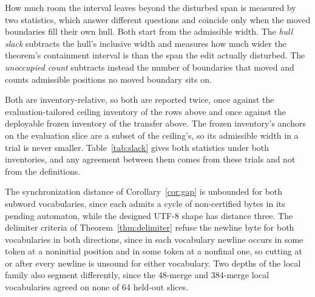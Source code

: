 \documentclass[11pt,a4paper]{article}
\theoremstyle{definition}
\theoremstyle{plain}
\newcommand{\code}[1]{\texttt{#1}}
\begin{document}
How much room the interval leaves beyond the disturbed span is measured by two statistics, which answer different
questions and coincide only when the moved boundaries fill their own hull. Both start from the admissible width. The
\emph{hull slack} subtracts the hull's inclusive width and measures how much wider the theorem's containment interval is
than the span the edit actually disturbed. The \emph{unoccupied count} subtracts instead the number of boundaries that
moved and counts admissible positions no moved boundary sits on.

Both are inventory-relative, so both are reported twice, once against the evaluation-tailored ceiling inventory of the
rows above and once against the deployable frozen inventory of the transfer above. The frozen inventory's anchors on the
evaluation slice are a subset of the ceiling's, so its admissible width in a trial is never smaller.
Table~\ref{tab:slack} gives both statistics under both inventories, and any agreement between them comes from these
trials and not from the definitions.

\begin{table}[!htbp]
\centering

\caption{Median (p50) and ninetieth percentile (p90) of the hull slack and the unoccupied count under both inventories,
in admissible boundary positions. Each measures how much of Theorem~\ref{thm:edit}'s containment interval an edit left
unused, and \code{splitting\_measurements.py} emits both. The ceiling inventory is computed exhaustively on the
evaluation slice, and the frozen hybrid inventory combines all certified bytes with the certified windows of widths two
to four calibrated on the disjoint adjacent slice and applied out of sample.}
\label{tab:slack}
\end{table}

The synchronization distance of Corollary~\ref{cor:gap} is unbounded for both subword vocabularies, since each admits a
cycle of non-certified bytes in its pending automaton, while the designed UTF-8 shape has distance three. The delimiter
criteria of Theorem~\ref{thm:delimiter} refuse the newline byte for both vocabularies in both directions, since in each
vocabulary newline occurs in some token at a noninitial position and in some token at a nonfinal one, so cutting at or
after every newline is unsound for either vocabulary. Two depths of the local family also segment differently, since the
48-merge and 384-merge local vocabularies agreed on none of 64 held-out slices.
\end{document}
